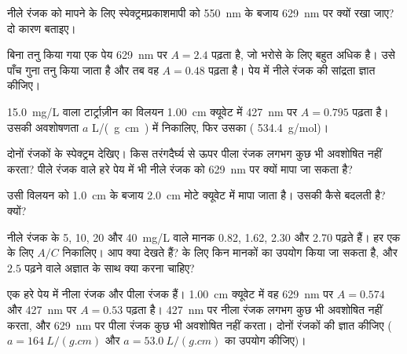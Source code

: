 \begin{exercise}[$\star\star$]\label{exo:g11:absorbance:7}
नीले रंजक को मापने के लिए स्पेक्ट्रमप्रकाशमापी को \qty{550}{nm} के बजाय
\qty{629}{nm} पर क्यों रखा जाए? दो कारण बताइए।
\end{exercise}

\begin{exercise}[$\star\star$]\label{exo:g11:absorbance:8}
बिना तनु किया गया एक पेय \qty{629}{nm} पर $A = 2.4$ पढ़ता है, जो भरोसे के लिए
बहुत अधिक है। उसे पाँच गुना तनु किया जाता है और तब वह $A = 0.48$ पढ़ता है। पेय में
नीले रंजक की सांद्रता ज्ञात कीजिए।
\end{exercise}

\begin{exercise}[$\star\star$]\label{exo:g11:absorbance:9}
\qty{15.0}{mg/L} वाला टार्ट्राज़ीन का विलयन \qty{1.00}{cm} क्यूवेट में
\qty{427}{nm} पर $A = 0.795$ पढ़ता है। उसकी अवशोषणता $a$
\si{L/(g.cm)} में निकालिए, फिर उसका  (
\qty{534.4}{g/mol})।
\end{exercise}

\begin{exercise}[$\star\star$]\label{exo:g11:absorbance:10}
दोनों रंजकों के स्पेक्ट्रम देखिए। किस तरंगदैर्घ्य से ऊपर पीला रंजक लगभग कुछ भी
अवशोषित नहीं करता? पीले रंजक वाले हरे पेय में भी नीले रंजक को
\qty{629}{nm} पर क्यों मापा जा सकता है?
\end{exercise}

\begin{exercise}[$\star\star$]\label{exo:g11:absorbance:11}
उसी विलयन को \qty{1.0}{cm} के बजाय \qty{2.0}{cm} मोटे क्यूवेट में मापा जाता
है। उसकी  कैसे बदलती है? क्यों?
\end{exercise}

\begin{exercise}[$\star\star\star$]\label{exo:g11:absorbance:12}
नीले रंजक के 5, 10, 20 और \qty{40}{mg/L} वाले मानक 0.82, 1.62,
2.30 और 2.70 पढ़ते हैं। हर एक के लिए $A / C$ निकालिए। आप क्या देखते हैं?  के लिए किन मानकों का उपयोग किया जा सकता है, और $2.5$ पढ़ने वाले अज्ञात के साथ
क्या करना चाहिए?
\end{exercise}

\begin{exercise}[$\star\star\star$]\label{exo:g11:absorbance:13}
एक हरे पेय में नीला रंजक और पीला रंजक हैं। \qty{1.00}{cm} क्यूवेट में वह
\qty{629}{nm} पर $A = 0.574$ और \qty{427}{nm} पर $A = 0.53$
पढ़ता है। \qty{427}{nm} पर नीला रंजक लगभग कुछ भी अवशोषित नहीं करता,
और \qty{629}{nm} पर पीला रंजक कुछ भी अवशोषित नहीं करता। दोनों रंजकों की  ज्ञात कीजिए ($a = \qty{164}{L/(g.cm)}$ और
$a = \qty{53.0}{L/(g.cm)}$ का उपयोग कीजिए)।
\end{exercise}

